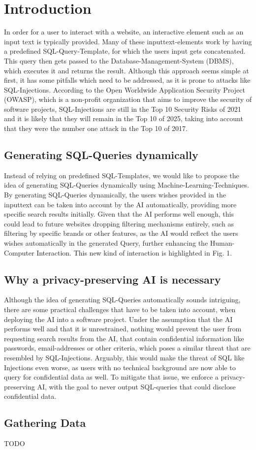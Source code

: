 \documentclass[../../submission.tex]{subfiles}
\begin{document}
\section{Introduction}
In order for a user to interact with a website, an interactive element such as 
an input text is typically provided. Many of these inputtext-elements work by
having a predefined SQL-Query-Template, for which the users input gets concatenated.
This query then gets passed to the Database-Management-System (DBMS), which executes
it and returns the result. Although this approach seems simple at first, it has 
some pitfalls which need to be addressed, as it is prone to attacks like SQL-Injections.
According to the Open Worldwide Application Security Project (OWASP), which is a 
non-profit organization that aims to improve the security of software projects,
SQL-Injections are still in the Top 10 Security Risks of 2021 and it is likely that 
they will remain in the Top 10 of 2025, taking into account that they were the number
one attack in the Top 10 of 2017.
\subsection{Generating SQL-Queries dynamically}
Instead of relying on predefined SQL-Templates, we would like to propose the 
idea of generating SQL-Queries dynamically using Machine-Learning-Techniques.\\
By generating SQL-Queries dynamically, the users wishes provided in the inputtext can 
be taken into account by the AI automatically, providing more specific search results initially.
Given that the AI performs well enough, this could lead to future websites dropping 
filtering mechanisms entirely, such as filtering by specific brands or other features,
as the AI would reflect the users wishes automatically in the generated Query, 
further enhancing the Human-Computer Interaction. This new kind of interaction is highlighted
in Fig. 1.
\subsection{Why a privacy-preserving AI is necessary}
Although the idea of generating SQL-Queries automatically sounds intriguing, there 
are some practical challenges that have to be taken into account, when deploying the AI 
into a software project. Under the assumption
that the AI performs well and that it is unrestrained, nothing would prevent the user
from requesting search results from the AI, that contain confidential information like 
passwords, email-addresses or other criteria, which poses a similar threat that 
are resembled by SQL-Injections. Arguably, this would make the threat of SQL like 
Injections even worse, as users with no technical background are now able to query 
for confidential data as well. To mitigate that issue, we enforce a privacy-preserving AI,
with the goal to never output SQL-queries that could disclose confidential data.
\subsection{Gathering Data}
TODO
\end{document}
